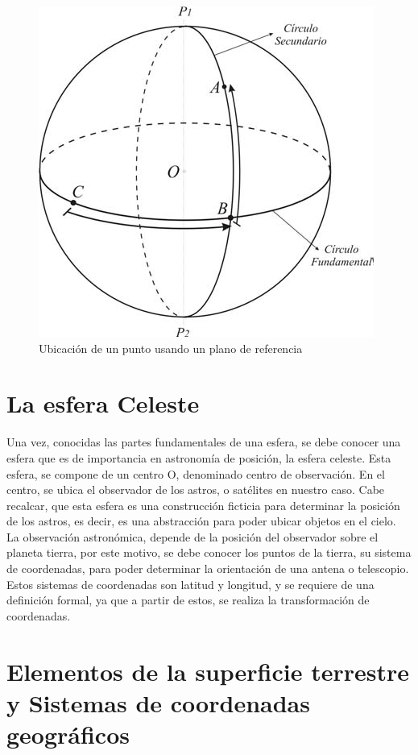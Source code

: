 \begin{figure}[ht!]
	\centering
	\includegraphics{ubicacion_esfera_point} 
	\caption{Ubicación de un punto usando un plano de referencia}
	\label{fig:ubic_point_sphere}
\end{figure}


\section{La esfera Celeste} \label{sec:esfera_celeste}

Una vez, conocidas las partes fundamentales de una esfera, se debe conocer una esfera que es de importancia en astronomía de posición, la esfera celeste. Esta esfera, se compone de un centro O, denominado centro de observación. En el centro, se ubica el observador de los astros, o satélites en nuestro caso. Cabe recalcar, que esta esfera es una construcción ficticia para determinar la posición de los astros, es decir, es una abstracción para poder ubicar objetos en el cielo. 
La observación astronómica, depende de la posición del observador sobre el planeta tierra, por este motivo, se debe conocer los puntos de la tierra, su sistema de coordenadas, para poder determinar la orientación de una antena o telescopio. Estos sistemas de coordenadas son latitud y longitud, y se requiere de una definición formal, ya que a partir de estos, se realiza la transformación de coordenadas. 

\section{Elementos de la superficie terrestre y Sistemas de coordenadas geográficos}

